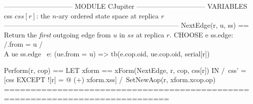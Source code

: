 \documentclass{article}
\begin{document}
\begin{tla}
------------------------------ MODULE CJupiter ------------------------------
VARIABLES css  \* $css[r]$: the $n$-ary ordered state space at replica $r$
-----------------------------------------------------------------------------
NextEdge(r, u, ss) == \* Return the \emph{first} outgoing edge from $u$ in $ss$ at replica $r$. 
    CHOOSE e \in ss.edge:
        /\e.from = u 
        /\\A ue \in ss.edge \ {e}: (ue.from = u) => tb(e.cop.oid, ue.cop.oid, serial[r])

Perform(r, cop) == 
    LET xform == xForm(NextEdge, r, cop, css[r])
    IN  /\ css' = [css EXCEPT ![r] = @ (+) xform.xss]
        /\ SetNewAop(r, xform.xcop.op)
=============================================================================
\end{tla}
\end{document}
